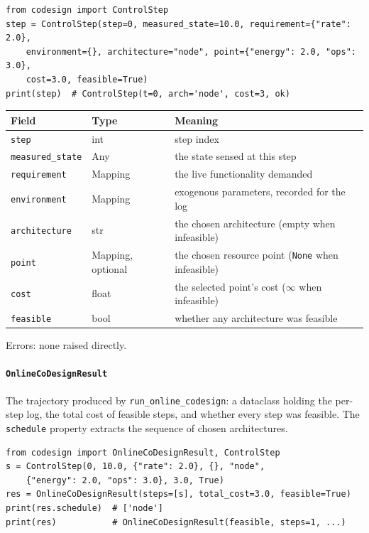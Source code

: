 \documentclass[11pt,a4paper]{article}
\begin{document}
\begin{lstlisting}
from codesign import ControlStep
step = ControlStep(step=0, measured_state=10.0, requirement={"rate": 2.0},
    environment={}, architecture="node", point={"energy": 2.0, "ops": 3.0},
    cost=3.0, feasible=True)
print(step)  # ControlStep(t=0, arch='node', cost=3, ok)
\end{lstlisting}

\begin{center}
\begin{tabular}{@{}llp{}@{}}
\toprule
Field & Type & Meaning \\
\midrule
\texttt{step} & int & step index \\
\texttt{measured\_state} & Any & the state sensed at this step \\
\texttt{requirement} & Mapping & the live functionality demanded \\
\texttt{environment} & Mapping & exogenous parameters, recorded for the log \\
\texttt{architecture} & str & the chosen architecture (empty when
  infeasible) \\
\texttt{point} & Mapping, optional & the chosen resource point
  (\texttt{None} when infeasible) \\
\texttt{cost} & float & the selected point's cost (\(\infty\) when
  infeasible) \\
\texttt{feasible} & bool & whether any architecture was feasible \\
\bottomrule
\end{tabular}
\end{center}
Errors: none raised directly.

\paragraph{\texttt{OnlineCoDesignResult}}\label{ref:online_codesign:onlinecodesignresult}
The trajectory produced by \texttt{run\_online\_codesign}: a dataclass
holding the per-step log, the total cost of feasible steps, and whether every
step was feasible. The \texttt{schedule} property extracts the sequence of
chosen architectures.

\begin{lstlisting}
from codesign import OnlineCoDesignResult, ControlStep
s = ControlStep(0, 10.0, {"rate": 2.0}, {}, "node",
    {"energy": 2.0, "ops": 3.0}, 3.0, True)
res = OnlineCoDesignResult(steps=[s], total_cost=3.0, feasible=True)
print(res.schedule)  # ['node']
print(res)           # OnlineCoDesignResult(feasible, steps=1, ...)
\end{lstlisting}
\end{document}
